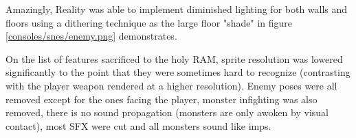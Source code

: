 \par
Amazingly, Reality was able to implement diminished lighting for both walls and floors using a dithering technique as the large floor "shade" in figure \ref{consoles/snes/enemy.png} demonstrates.\\
\par
 On the list of features sacrificed to the holy RAM, sprite resolution was lowered significantly to the point that they were sometimes hard to recognize (contrasting with the player weapon rendered at a higher resolution). Enemy poses were all removed except for the ones facing the player, monster infighting was also removed, there is no sound propagation (monsters are only awoken by visual contact), most SFX were cut and all monsters sound like imps.
\\
\par
{}

   

